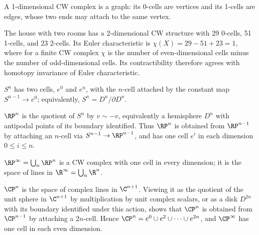 \begin{example}
\label{ex:cw-graph}
A 1-dimensional CW complex is a graph: its 0-cells are vertices and its 1-cells
are edges, whose two ends may attach to the same vertex.
\end{example}

\begin{example}
\label{ex:house-two-rooms-euler-characteristic}
The house with two rooms has a 2-dimensional CW structure with 29 0-cells, 51 1-cells,
and 23 2-cells. Its Euler characteristic is
$\chi(X)=29-51+23=1$, where for a finite CW complex $\chi$ is the number of
even-dimensional cells minus the number of odd-dimensional cells. Its contractibility
therefore agrees with homotopy invariance of Euler characteristic.
\end{example}

\begin{example}
\label{ex:sphere-two-cells}
$S^n$ has two cells, $e^0$ and $e^n$, with the $n$-cell attached by the constant
map $S^{n-1}\to e^0$; equivalently, $S^n=D^n/\partial D^n$.
\end{example}

\begin{example}
\label{ex:real-projective-space-cw}
$\RP^n$ is the quotient of $S^n$ by $v\sim -v$, equivalently a hemisphere $D^n$
with antipodal points of its boundary identified. Thus $\RP^n$ is obtained from
$\RP^{n-1}$ by attaching an $n$-cell via $S^{n-1}\to\RP^{n-1}$, and has one cell
$e^i$ in each dimension $0\le i\le n$.
\end{example}

\begin{example}
\label{ex:infinite-real-projective-space}
$\RP^\infty=\bigcup_n\RP^n$ is a CW complex with one cell in every dimension;
it is the space of lines in $\R^\infty=\bigcup_n\R^n$.
\end{example}

\begin{example}
\label{ex:complex-projective-space-cw}
$\CP^n$ is the space of complex lines in $\C^{n+1}$. Viewing it as the quotient of
the unit sphere in $\C^{n+1}$ by multiplication by unit complex scalars, or as a disk
$D^{2n}$ with its boundary identified under this action, shows that $\CP^n$ is obtained
from $\CP^{n-1}$ by attaching a $2n$-cell. Hence
$\CP^n=e^0\cup e^2\cup\cdots\cup e^{2n}$, and $\CP^\infty$ has one cell in each
even dimension.
\end{example}

